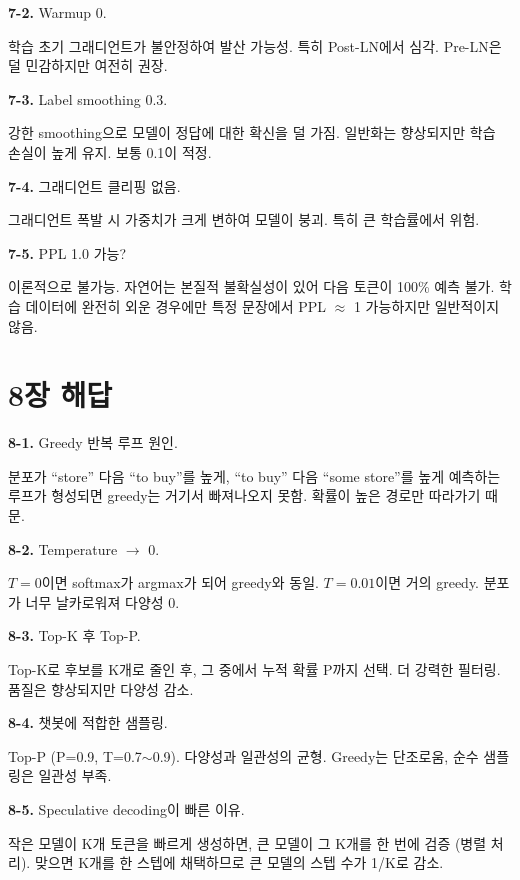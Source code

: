 \textbf{7-2.} Warmup 0.

학습 초기 그래디언트가 불안정하여 발산 가능성. 특히 Post-LN에서 심각. Pre-LN은 덜 민감하지만 여전히 권장.

\textbf{7-3.} Label smoothing 0.3.

강한 smoothing으로 모델이 정답에 대한 확신을 덜 가짐. 일반화는 향상되지만 학습 손실이 높게 유지. 보통 0.1이 적정.

\textbf{7-4.} 그래디언트 클리핑 없음.

그래디언트 폭발 시 가중치가 크게 변하여 모델이 붕괴. 특히 큰 학습률에서 위험.

\textbf{7-5.} PPL 1.0 가능?

이론적으로 불가능. 자연어는 본질적 불확실성이 있어 다음 토큰이 100\% 예측 불가. 학습 데이터에 완전히 외운 경우에만 특정 문장에서 PPL $\approx$ 1 가능하지만 일반적이지 않음.

\section{8장 해답}

\textbf{8-1.} Greedy 반복 루프 원인.

분포가 ``store'' 다음 ``to buy''를 높게, ``to buy'' 다음 ``some store''를 높게 예측하는 루프가 형성되면 greedy는 거기서 빠져나오지 못함. 확률이 높은 경로만 따라가기 때문.

\textbf{8-2.} Temperature $\to$ 0.

$T=0$이면 softmax가 argmax가 되어 greedy와 동일. $T=0.01$이면 거의 greedy. 분포가 너무 날카로워져 다양성 0.

\textbf{8-3.} Top-K 후 Top-P.

Top-K로 후보를 K개로 줄인 후, 그 중에서 누적 확률 P까지 선택. 더 강력한 필터링. 품질은 향상되지만 다양성 감소.

\textbf{8-4.} 챗봇에 적합한 샘플링.

Top-P (P=0.9, T=0.7$\sim$0.9). 다양성과 일관성의 균형. Greedy는 단조로움, 순수 샘플링은 일관성 부족.

\textbf{8-5.} Speculative decoding이 빠른 이유.

작은 모델이 K개 토큰을 빠르게 생성하면, 큰 모델이 그 K개를 한 번에 검증 (병렬 처리). 맞으면 K개를 한 스텝에 채택하므로 큰 모델의 스텝 수가 1/K로 감소.
